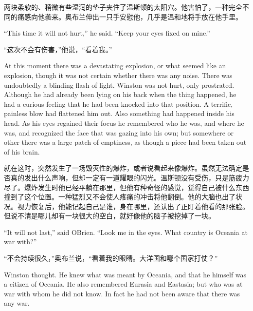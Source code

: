 \begin{paracol}{2}
\switchcolumn

两块柔软的、稍微有些湿润的垫子夹住了温斯顿的太阳穴。他害怕了，一种完全不同的痛感向他袭来。奥布兰伸出一只手安慰他，几乎是温和地将手放在他手里。

\switchcolumn*

``This time it will not hurt,'' he said. ``Keep your eyes fixed on mine.''

\switchcolumn

``这次不会有伤害，''他说，``看着我。''

\switchcolumn*

At this moment there was a devastating explosion, or what seemed like an
explosion, though it was not certain whether there was any noise. There
was undoubtedly a blinding flash of light. Winston was not hurt, only
prostrated. Although he had already been lying on his back when the
thing happened, he had a curious feeling that he had been knocked into
that position. A terrific, painless blow had flattened him out. Also
something had happened inside his head. As his eyes regained their focus
he remembered who he was, and where he was, and recognized the face that
was gazing into his own; but somewhere or other there was a large patch
of emptiness, as though a piece had been taken out of his brain.

\switchcolumn

就在这时，突然发生了一场毁灭性的爆炸，或者说看起来像爆炸。虽然无法确定是否真的发出什么声响，但却一定有一道耀眼的闪光。温斯顿没有受伤，只是筋疲力尽了。爆炸发生时他已经平躺在那里，但他有种奇怪的感觉，觉得自己被什么东西撞到了这个位置。一种猛烈又不会使人疼痛的冲击将他翻倒。他的大脑也出了状况。视力恢复后，他能记起自己是谁，身在哪里，还认出了正盯着他看的那张脸。但说不清是哪儿却有一块很大的空白，就好像他的脑子被挖掉了一块。

\switchcolumn*

``It will not last,'' said O\textquotesingle Brien. ``Look me in the eyes.
What country is Oceania at war with?''

\switchcolumn

``不会持续很久，''奥布兰说，``看着我的眼睛。大洋国和哪个国家打仗？''

\switchcolumn*

Winston thought. He knew what was meant by Oceania, and that he himself
was a citizen of Oceania. He also remembered Eurasia and Eastasia; but
who was at war with whom he did not know. In fact he had not been aware
that there was any war.

\switchcolumn


\end{paracol}
